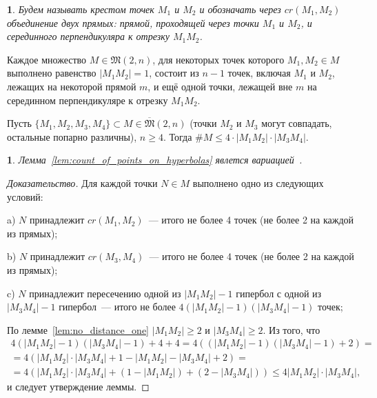 \documentclass[11pt,twoside,draft
]{article}
\newtheorem{Definition}{\indent {\sc Definition}}
\newtheorem{Remark}{\indent {\sc Remark}}
\begin{document}
\begin{Definition}
	\cite[Определение 2.5]{my-pps-linear-bound-2019}
	Будем называть \textit{крестом} точек $M_1$ и $M_2$ и обозначать через $cr(M_1,M_2)$ объединение двух прямых:
	прямой, проходящей через точки $M_1$ и $M_2$,
	и серединного перпендикуляра к отрезку $M_1 M_2$.
\end{Definition}

\begin{lemma}
	\cite[Theorem 3.10]{my-pps-linear-bound-2019}
	\label{lem:no_distance_one}
	Каждое множество $M\in\mathfrak{M}(2,n)$,
	для некоторых точек которого $M_1,M_2 \in M$ выполнено равенство $|M_1 M_2|=1$,
	состоит из $n-1$ точек, включая $M_1$ и $M_2$, лежащих на некоторой прямой $m$,
	и ещё одной точки, лежащей вне $m$ на серединном перпендикуляре к отрезку $M_1 M_2$.
\end{lemma}


\begin{lemma}
	\label{lem:count_of_points_on_hyperbolas}
	Пусть $\{M_1, M_2, M_3, M_4\} \subset M\in\overline{\mathfrak{M}}(2,n)$
	(точки $M_2$ и $M_3$ могут совпадать, остальные попарно различны), $n\geq 4$.
	Тогда $\# M \leq 4 \cdot |M_1 M_2| \cdot |M_3 M_4|$.
\end{lemma}

\begin{Remark}
	Лемма~\ref{lem:count_of_points_on_hyperbolas} явлется вариацией~\cite{erdos1945integral}.
\end{Remark}

\begin{proof}[Доказательство]
	Для каждой точки $N\in M$ выполнено одно из следующих условий:

	a) $N$ принадлежит $cr(M_1,M_2)$~--- итого не более 4 точек (не более 2 на каждой из прямых);

	b) $N$ принадлежит $cr(M_3,M_4)$~--- итого не более 4 точек (не более 2 на каждой из прямых);

	c) $N$ принадлежит пересечению одной из $|M_1 M_2| - 1$ гипербол
	с одной из $|M_3 M_4| - 1$ гипербол~--- итого не более  $4 (|M_1 M_2| - 1)(|M_3 M_4| - 1)$ точек;

	По лемме~\ref{lem:no_distance_one} $|M_1 M_2| \geq 2$ и $|M_3 M_4| \geq 2$.
	Из того, что
	\begin{multline}
		4 (|M_1 M_2| - 1)(|M_3 M_4| - 1) + 4 + 4
		=
		4 ( (|M_1 M_2| - 1)(|M_3 M_4| - 1) + 2)
		=
		\\=
		4 ( |M_1 M_2| \cdot |M_3 M_4| + 1 - |M_1 M_2| - |M_3 M_4| + 2)
		=
		\\=
		4 ( |M_1 M_2| \cdot |M_3 M_4| + (1 - |M_1 M_2|) + (2 - |M_3 M_4|))
		\leq
		4 |M_1 M_2| \cdot |M_3 M_4|
		,
	\end{multline}
	и следует утверждение леммы.
\end{proof}
\end{document}
